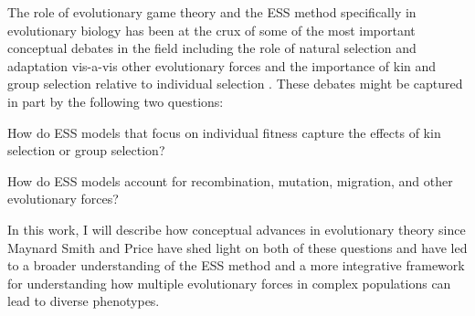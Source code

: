 \documentclass[11pt]{article}
\begin{document}
The role of evolutionary game theory and the ESS method specifically in evolutionary biology has been at the crux of some of the most important conceptual debates in the field including the role of natural selection and adaptation vis-a-vis other evolutionary forces \cite[e.g.,][]{MaynardSmith:1978,Gould:Lewontin:1979,Lewontin:1979,Orzack:Sober:1994,Gardner:2017,Kern:Hahn:2018,Jensen:Payseur:2019} and the importance of kin and group selection relative to individual selection
\cite[e.g.,][]{Hamilton:1963,Maynard-Smith:1964,Price:1972:cov,Wilson:Wilson:2007,Leigh:2010,Akcay:VanCleve:2012,West:Griffin:2007,Gardner:Grafen:2009,Nowak:Tarnita:2010,Abbot:Abe:2011,Allen:Nowak:2013,Birch:2014,Birch:2017,Nowak:McAvoy:2017}. These debates might be captured in part by the following two questions: \begin{ilnum} \item \label{q:I} How do ESS models that focus on individual fitness capture the effects of kin selection or group selection? \item \label{q:II} How do ESS models account for recombination, mutation, migration, and other evolutionary forces? \end{ilnum} In this work, I will describe how conceptual advances in evolutionary theory since Maynard Smith and Price \cite{Maynard-Smith:Price:1973} have shed light on both of these questions and have led to a broader understanding of the ESS method and a more integrative framework for understanding how multiple evolutionary forces in complex populations can lead to diverse phenotypes.
\end{document}

